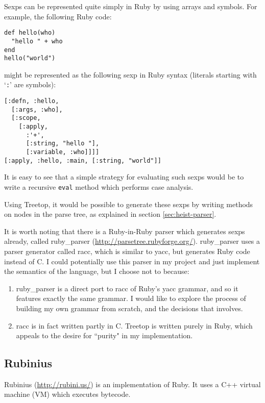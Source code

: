 Sexps can be represented quite simply in Ruby by using arrays and symbols. For example, the following Ruby code:

\begin{lstlisting}
def hello(who)
  "hello " + who
end
hello("world")
\end{lstlisting}

might be represented as the following sexp in Ruby syntax (literals starting with `\texttt{:}' are symbols):

\begin{lstlisting}
[:defn, :hello,
  [:args, :who],
  [:scope,
    [:apply,
      :'+',
      [:string, "hello "],
      [:variable, :who]]]]
[:apply, :hello, :main, [:string, "world"]]
\end{lstlisting}

It is easy to see that a simple strategy for evaluating such sexps would be to write a recursive \texttt{eval} method which performs case analysis.

Using Treetop, it would be possible to generate these sexps by writing methods on nodes in the parse tree, as explained in section \ref{sec:heist-parser}.

It is worth noting that there is a Ruby-in-Ruby parser which generates sexps already, called ruby\_parser (\url{http://parsetree.rubyforge.org/}).
 ruby\_parser uses a parser generator called racc, which is similar to yacc, but generates Ruby code instead of C. I could potentially use this parser in my project and just implement the semantics of the language, but I choose not to because:

\begin{enumerate}
	\item ruby\_parser is a direct port to racc of Ruby's yacc grammar, and so it features exactly the same grammar. I would like to explore the process of building my own grammar from scratch, and the decisions that involves.
	\item racc is in fact written partly in C. Treetop is written purely in Ruby, which appeals to the desire for ``purity" in my implementation.
\end{enumerate}

\subsection{Rubinius}
\label{sec:rubinius}

Rubinius (\url{http://rubini.us/}) is an implementation of Ruby. It uses a C++ virtual machine (VM) which executes bytecode.

